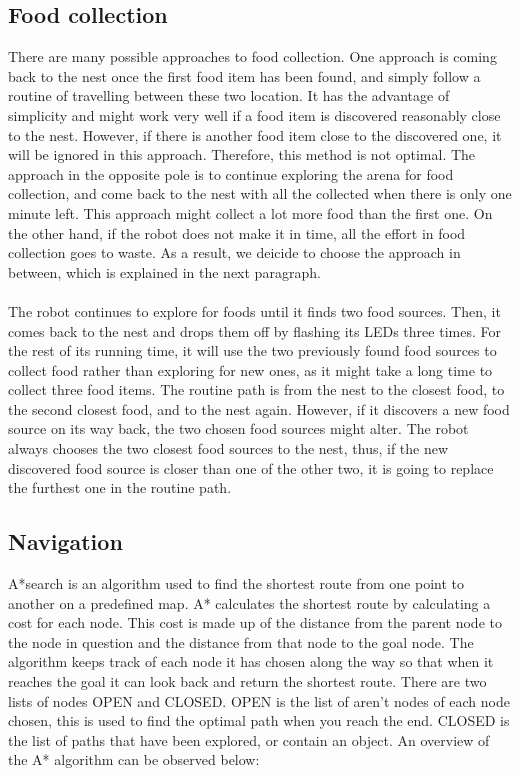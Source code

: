 \documentclass[]{article}
\begin{document}
\subsection{Food collection}

There are many possible approaches to food collection. One approach is coming back to the nest once the first food item has been found, and simply follow a routine of travelling between these two location. It has the advantage of simplicity and might work very well if a food item is discovered reasonably close to the nest. However, if there is another food item close to the discovered one, it will be ignored in this approach. Therefore, this method is not optimal. The approach in the opposite pole is to continue exploring the arena for food collection, and come back to the nest with all the collected when there is only one minute left. This approach might collect a lot more food than the first one. On the other hand, if the robot does not make it in time, all the effort in food collection goes to waste. As a result, we deicide to choose the approach in between, which is explained in the next paragraph.\\\\
The robot continues to explore for foods until it finds two food sources. Then, it comes back to the nest and drops them off by flashing its LEDs three times. For the rest of its running time, it will use the two previously found food sources to collect food rather than exploring for new ones, as it might take a long time to collect three food items. The routine path is from the nest to the closest food, to the second closest food, and to the nest again. However, if it discovers a new food source on its way back, the two chosen food sources might alter. The robot always chooses the two closest food sources to the nest, thus, if the new discovered food source is closer than one of the other two, it is going to replace the furthest one in the routine path.

\subsection{Navigation}

A*search is an algorithm used to find the shortest route from one point to another on a predefined map. A* calculates the shortest route by calculating a cost for each node. This cost is made up of the distance from the parent node to the node in question and the distance from that node to the goal node. The algorithm keeps track of each node it has chosen along the way so that when it reaches the goal it can look back and return the shortest route. There are two lists of nodes OPEN and CLOSED.  OPEN is the list of aren't nodes of each node chosen, this is used to find the optimal path when you reach the end. CLOSED is the list of paths that have been explored, or contain an object. An overview of the A* algorithm can be observed below:
\end{document}

